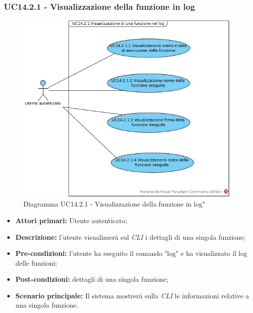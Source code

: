 \subsubsection{UC14.2.1 - Visualizzazione della funzione in log}
\begin{figure}[h]
	\centering
	\includegraphics[width=0.7\linewidth]{res/img/UC14.2.1.jpg}
	\caption{Diagramma UC14.2.1 - Visualizzazione della funzione in log"}
\end{figure}
\begin{itemize}
	\item \textbf{Attori primari:} Utente autenticato;
	\item \textbf{Descrizione:} l'utente visualizzerà sul \textit{CLI\glo} i dettagli di una singola funzione;
	\item \textbf{Pre-condizioni:} l'utente ha eseguito il comando "log" e ha visualizzato il log delle funzioni;
	\item \textbf{Post-condizioni:} dettagli di una singola funzione;
	\item \textbf{Scenario principale:} Il sistema mostrerà sulla \textit{CLI\glo} le informazioni relative a una singola funzione.
\end{itemize}
